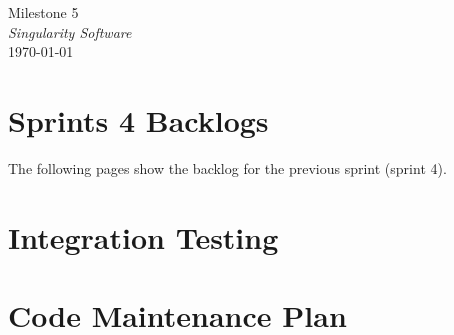 \documentclass[12pt]{article}
\begin{document}
\begin{center}
	\LARGE{Milestone 5} \\
	\Large{\textit{Singularity Software}} \\
	\vspace{.05in}
	\normalsize{\today} \\
\end{center}

\section*{Sprints 4 Backlogs}
The following pages show the backlog for the previous sprint (sprint 4). \\

%

\section*{Integration Testing}


\section*{Code Maintenance Plan}

\clearpage
        
\end{document}
